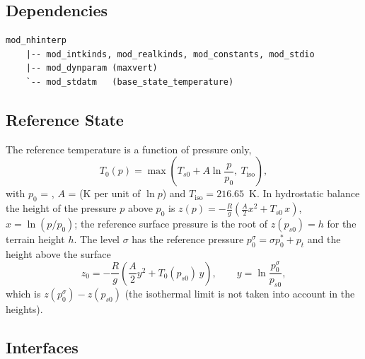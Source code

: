\subsection{Dependencies}

\begin{lstlisting}
mod_nhinterp
    |-- mod_intkinds, mod_realkinds, mod_constants, mod_stdio
    |-- mod_dynparam (maxvert)
    `-- mod_stdatm   (base_state_temperature)
\end{lstlisting}

\subsection{Reference State}

The reference temperature is a function of pressure only,
\begin{equation}
  T_0(p) = \max\left(T_{s0} + A\ln\frac{p}{p_0},\ T_\text{iso}\right),
\end{equation}
with $p_0$ = , $A$ = 
(K per unit of $\ln p$) and $T_\text{iso} = 216.65$~K. In hydrostatic
balance the height of the pressure $p$ above $p_0$ is
$z(p) = -\frac{R}{g}\left(\frac{A}{2}x^2 + T_{s0}\,x\right)$, $x =
\ln(p/p_0)$; the reference surface pressure is the root of $z(p_{s0}) =
h$ for the terrain height $h$. The level $\sigma$ has the reference
pressure $p_0^\sigma = \sigma p^*_0 + p_t$ and the height above the surface
\begin{equation}
  z_0 = -\frac{R}{g}\left(\frac{A}{2}y^2 + T_0(p_{s0})\,y\right),
  \qquad y = \ln\frac{p_0^\sigma}{p_{s0}},
\end{equation}
which is $z(p_0^\sigma) - z(p_{s0})$ (the isothermal limit is not taken
into account in the heights).

\subsection{Interfaces}

